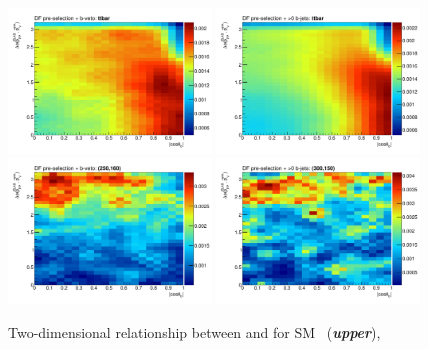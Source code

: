 \begin{figure}[!htb]
    \begin{center}
        \includegraphics[width=0.48\textwidth]{figures/search_stop2l/strategy/corr2d/wwbveto_cosThetaB_DPB_vSS_ttbar_2d}
        \includegraphics[width=0.48\textwidth]{figures/search_stop2l/strategy/corr2d/wwb_cosThetaB_DPB_vSS_ttbar_2d}
        \includegraphics[width=0.48\textwidth]{figures/search_stop2l/strategy/corr2d/wwbveto_cosThetaB_DPB_vSS_bwn250_160_2d}
        \includegraphics[width=0.48\textwidth]{figures/search_stop2l/strategy/corr2d/wwb_cosThetaB_DPB_vSS_bwn300_150_2d}
        \caption{
            Two-dimensional relationship between \dpb and \cosb for SM \ttbar~(\textit{\textbf{upper}}),
}
\end{center}
\end{figure}
